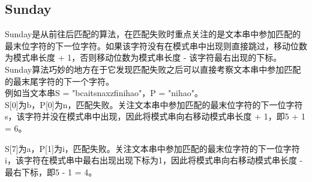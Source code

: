 \subsection{Sunday}

Sunday是从前往后匹配的算法，在匹配失败时重点关注的是文本串中参加匹配的最末位字符的下一位字符。如果该字符没有在模式串中出现则直接跳过，移动位数为模式串长度 + 1，否则移动位数为模式串长度 - 该字符最右出现的下标。\\

Sunday算法巧妙的地方在于它发现匹配失败之后可以直接考察文本串中参加匹配的最末尾字符的下一个字符。\\

例如当文本串S = "bcaitsnaxzfinihao"，P = "nihao"。\\

S[0]为b，P[0]为n，匹配失败。关注文本串中参加匹配的最末位字符的下一位字符s，该字符并没在模式串中出现，因此将模式串向右移动模式串长度 + 1，即5 + 1 = 6。

\begin{table}[H]
	\centering
\end{table}

S[7]为a，P[1]为i，匹配失败。关注文本串中参加匹配的最末位字符的下一位字符i，该字符在模式串中最右出现出现下标为1，因此将模式串向右移动模式串长度 - 最右下标，即5 - 1 = 4。

